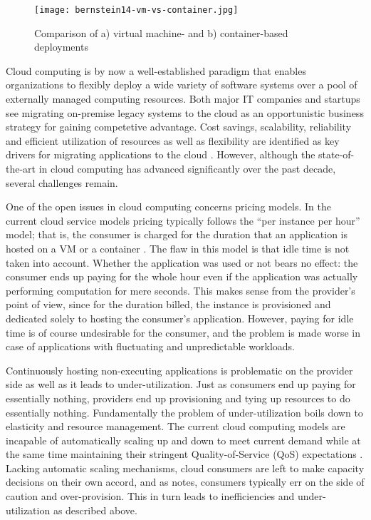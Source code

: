 \begin{figure}[h]
  \centering
  \texttt{[image: bernstein14-vm-vs-container.jpg]}
  \caption{Comparison of a) virtual machine- and b) container-based deployments \parencite{bernstein14containers}}
  \label{fig:vmVsContainer}
\end{figure}

Cloud computing is by now a well-established paradigm that enables organizations to flexibly deploy a wide variety of software systems over a pool of externally managed computing resources. Both major IT companies and startups see migrating on-premise legacy systems to the cloud as an opportunistic business strategy for gaining competetive advantage. Cost savings, scalability, reliability and efficient utilization of resources as well as flexibility are identified as key drivers for migrating applications to the cloud \parencite{jamshidi13cloudmigrationreview}. However, although the state-of-the-art in cloud computing has advanced significantly over the past decade, several challenges remain.

One of the open issues in cloud computing concerns pricing models. In the current cloud service models pricing typically follows the ``per instance per hour'' model; that is, the consumer is charged for the duration that an application is hosted on a VM or a container \parencite{varghese18next}. The flaw in this model is that idle time is not taken into account. Whether the application was used or not bears no effect: the consumer ends up paying for the whole hour even if the application was actually performing computation for mere seconds. This makes sense from the provider's point of view, since for the duration billed, the instance is provisioned and dedicated solely to hosting the consumer's application. However, paying for idle time is of course undesirable for the consumer, and the problem is made worse in case of applications with fluctuating and unpredictable workloads.

Continuously hosting non-executing applications is problematic on the provider side as well as it leads to under-utilization. Just as consumers end up paying for essentially nothing, providers end up provisioning and tying up resources to do essentially nothing. Fundamentally the problem of under-utilization boils down to elasticity and resource management. The current cloud computing models are incapable of automatically scaling up and down to meet current demand while at the same time maintaining their stringent Quality-of-Service (QoS) expectations \parencite{buyya2017manifesto}. Lacking automatic scaling mechanisms, cloud consumers are left to make capacity decisions on their own accord, and as \textcite{robert2016serverlessarchitectures} notes, consumers typically err on the side of caution and over-provision. This in turn leads to inefficiencies and under-utilization as described above.

